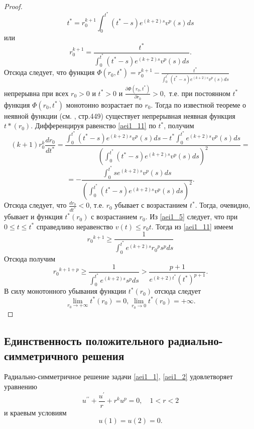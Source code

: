 \begin{proof}
$$
t^*=r_0^{k+1}\int_0^{t^*}(t^*-s)e^{(k+2)s}v^p(s)ds
$$
или
\begin{equation}\label{aei1_11}
r_0^{k+1}=\frac{t^*}{\int_0^{t^*}(t^*-s)e^{(k+2)s}v^p(s)ds}.
\end{equation}
Отсюда следует, что функция $
\Phi(r_0, t^*)=r_0^{k+1}-\frac{t^*}{\int_0^{t^*}(t^*-s)e^{(k+2)s}v^p(s)ds}$
непрерывна при всех $ r_0>0 $ и $ t^*>0 $ и $ \frac{\partial
\Phi(r_0, t^*)}{\partial r_0}>0, $ т.е. при постоянном $ t^* $
функция $ \Phi(r_0,t^*)$ монотонно возрастает по $ r_0 $. Тогда по
известной теореме о неявной функции (см. \cite{aeiL_15}, стр.449) существует
непрерывная неявная функция $ t*(r_0). $  Дифференцируя равенство
\eqref{aei1_11} по $ t^* $, получим
$$
(k+1)r_0^k \frac{dr_0}{dt^*}= \frac
{\int_0^{t^*}(t^*-s)e^{(k+2)s}v^p(s)ds- t^*
\int_0^{t^*}e^{(k+2)s}v^p(s)ds} { \left (
\int_0^{t^*}(t^*-s)e^{(k+2)s}v^p(s)ds \right )^2}=
$$
$$
=-\frac {\int_0^{t^*}se^{(k+2)s}v^p(s)ds}{ \left (
\int_0^{t^*}(t^*-s)e^{(k+2)s}v^p(s)ds \right )^2}.
$$
Отсюда следует, что $ \frac{dr_0}{dt^*} <0 $, т.е. $ r_0 $ убывает с
возрастанием $ t^* $. Тогда, очевидно, убывает и функция $ t^*(r_0)
$ с возрастанием $ r_0 $. Из \eqref{aei1_5} следует, что при $ 0 \leq t \leq
t^* $ справедливо неравенство $ v(t) \leq r_0t$.
Тогда из \eqref{aei1_11} имеем
$$
{r_0}^{k+1} \geq \frac{1}{\int_0^{t^*}e^{(k+2)s}{r_0}^ps^pds}
$$
Отсюда получим
\begin{equation}\label{aei1_12}
{r_0}^{k+1+p} \geq \frac{1}{\int_0^{t^*}e^{(k+2)s}s^pds} >
\frac{p+1}{e^{(k+2)t^*} (t^*)^{p+1}}.
\end{equation}
В силу монотонного убывания  функции $ t^*(r_0) $ отсюда следует
$$
\displaystyle \lim_{r_0 \to +\infty}t^{*}(r_0)=0, \displaystyle
\lim_{r_0 \to 0}t^{*}(r_0)=+\infty.
$$
\end{proof}

 \subsection{Единственность положительного радиально-симметричного решения}

Радиально-симметричное решение задачи \eqref{aei1_1}, \eqref{aei1_2} удовлетворяет
уравнению
\begin{equation}\label{aei1_13}
u^{\prime\prime}+\frac{u^{\prime}}{r}+r^ku^p=0, \quad 1<r<2
\end{equation}
и краевым условиям
\begin{equation}\label{aei1_14}
u(1)=u(2)=0.
\end{equation}


